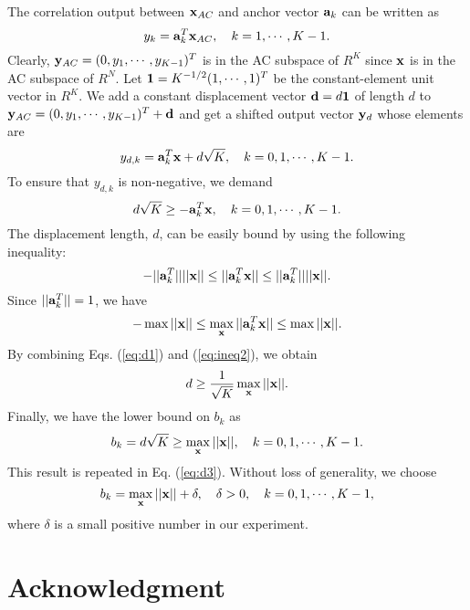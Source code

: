 \documentclass[preprint,12pt]{elsarticle}
\begin{document}
The correlation output between ${\bf x}_{AC}$ and
anchor vector ${\bf a}_k$ can be written as
\begin{equation}\label{eq:corr1}
y_{k} = {\bf a}^T_k {\bf x}_{AC}, \quad k=1, \cdots, K-1.
\end{equation}
Clearly, ${\bf y}_{AC}=(0, y_1, \cdots, y_{K-1})^T$ is in the AC subspace
of $R^K$ since ${\bf x}$ is in the AC subspace of $R^N$.  Let ${\bf 1}= 
K^{-1/2} (1, \cdots , 1)^T$ be the constant-element unit vector in $R^K$.  
We add a constant displacement vector ${\bf d} = d {\bf 1}$ of length
$d$ to ${\bf y}_{AC}=(0, y_1, \cdots, y_{K-1})^T + {\bf d}$ and get a
shifted output vector ${\bf y}_d$ whose elements are
\begin{equation}\label{eq:corr2}
y_{d,k} = {\bf a}^T_k {\bf x} + d \sqrt{K}, \quad k=0, 1, \cdots, K-1.
\end{equation}
To ensure that $y_{d,k}$ is non-negative, we demand
\begin{equation}\label{eq:d1}
d \sqrt{K} \ge - {\bf a}^T_k {\bf x}, \quad k=0, 1, \cdots, K-1.
\end{equation}
The displacement length, $d$, can be easily bound by using the following inequality:
\begin{equation}\label{eq:ineq1}
- ||{\bf a}^T_k|| ||{\bf x}|| \le ||{\bf a}^T_k {\bf x}|| \le ||{\bf a}^T_k|| ||{\bf x}||.
\end{equation}
Since $||{\bf a}^T_k||=1$, we have
\begin{equation}\label{eq:ineq2}
- \max || {\bf x} || \le \max_{\bf x} || {\bf a}^T_k {\bf x} || \le \max || {\bf x} ||.
\end{equation}
By combining Eqs. (\ref{eq:d1}) and (\ref{eq:ineq2}), we obtain
\begin{equation}\label{eq:d2}
d \ge \frac{1}{\sqrt{K}} \max_{\bf x} || {\bf x} ||.
\end{equation}
Finally, we have the lower bound on $b_k$ as
\begin{equation}\label{eq:ab2}
b_k = d {\sqrt{K}} \ge \max_{\bf x} || {\bf x} ||, \quad k=0, 1, \cdots, K-1. 
\end{equation}
This result is repeated in Eq. (\ref{eq:d3}). Without loss of generality, we choose
\begin{equation}\label{eq:ab3}
b_k = \max_{\bf x} || {\bf x} || + \delta, \quad \delta > 0, \quad k=0, 1, \cdots, K-1,
\end{equation}
where $\delta$ is a small positive number in our experiment. 

\section*{Acknowledgment}
\end{document}
